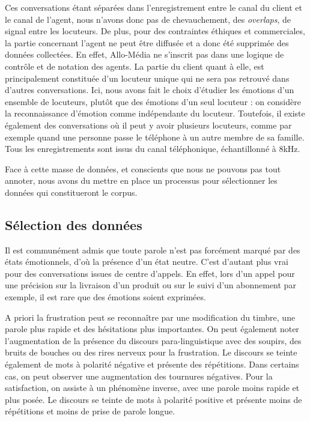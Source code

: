 Ces conversations étant séparées dans l'enregistrement entre le canal du client et le canal de l'agent, nous n'avons donc pas de chevauchement, des \textit{overlaps}, de signal entre les locuteurs. De plus, pour des contraintes éthiques et commerciales, la partie concernant l'agent ne peut être diffusée et a donc été supprimée des données collectées. En effet, Allo-Média ne s'inscrit pas dans une logique de contrôle et de notation des agents. La partie du client quant à elle, est principalement constituée d'un locuteur unique qui ne sera pas retrouvé dans d'autres conversations. Ici, nous avons fait le choix d'étudier les émotions d'un ensemble de locuteurs, plutôt que des émotions d'un seul locuteur : on considère la reconnaissance d'émotion comme indépendante du locuteur. Toutefois, il existe également des conversations où il peut y avoir plusieurs locuteurs, comme par exemple quand une personne passe le téléphone à un autre membre de sa famille. Tous les enregistrements sont issus du canal téléphonique, échantillonné à 8kHz.

Face à cette masse de données, et conscients que nous ne pouvons pas tout annoter, nous avons du mettre en place un processus pour sélectionner les données qui constitueront le corpus.

\subsection{Sélection des données}
Il est communément admis que toute parole n'est pas forcément marqué par des états émotionnels, d'où la présence d'un état neutre. C'est d'autant plus vrai pour des conversations issues de centre d'appels. En effet, lors d'un appel pour une précision sur la livraison d'un produit ou sur le suivi d'un abonnement par exemple, il est rare que des émotions soient exprimées.

A priori la frustration peut se reconnaître par une modification du timbre, une parole plus rapide et des hésitations plus importantes. On peut également noter l'augmentation de la présence du discours para-linguistique avec des soupirs, des bruits de bouches ou des rires nerveux pour la frustration. Le discours se teinte également de mots à polarité négative et présente des répétitions. Dans certains cas, on peut observer une augmentation des tournures négatives. Pour la satisfaction, on assiste à un phénomène inverse, avec une parole moins rapide et plus posée. Le discours se teinte de mots à polarité positive et présente moins de répétitions et moins de prise de parole longue.

